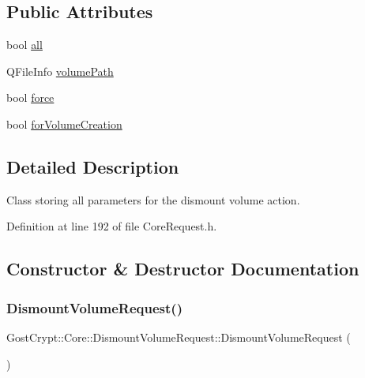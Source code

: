\subsection*{Public Attributes}
\begin{DoxyCompactItemize}
\item 
bool \hyperlink{struct_gost_crypt_1_1_core_1_1_dismount_volume_request_ac92703552fdf623e8da5beed25365673}{all}
\item 
Q\+File\+Info \hyperlink{struct_gost_crypt_1_1_core_1_1_dismount_volume_request_a616771872cfd4b04add726e4e4a5856e}{volume\+Path}
\item 
bool \hyperlink{struct_gost_crypt_1_1_core_1_1_dismount_volume_request_aeb0eb8d1c39db007b93d67aa0ff19bc1}{force}
\item 
bool \hyperlink{struct_gost_crypt_1_1_core_1_1_dismount_volume_request_a92e8de0f0940615170f03aff9a4d340b}{for\+Volume\+Creation}
\end{DoxyCompactItemize}


\subsection{Detailed Description}
Class storing all parameters for the dismount volume action. 

Definition at line 192 of file Core\+Request.\+h.



\subsection{Constructor \& Destructor Documentation}
\mbox{\label{struct_gost_crypt_1_1_core_1_1_dismount_volume_request_abd07af8e1fd2932075406e430c39e36d}} 
\subsubsection{\texorpdfstring{Dismount\+Volume\+Request()}{DismountVolumeRequest()}}
{\footnotesize\ttfamily Gost\+Crypt\+::\+Core\+::\+Dismount\+Volume\+Request\+::\+Dismount\+Volume\+Request (\begin{DoxyParamCaption}{ }\end{DoxyParamCaption})}



